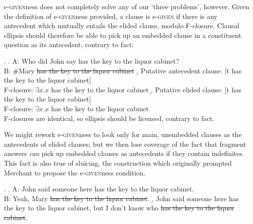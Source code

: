 \documentclass[doublespace]{umthesis}
\begin{document}

% 

e-\textsc{given}ness does not completely solve any of our `three problems', however. Given the definition of e-\textsc{given}ness provided, a clause is e-\textsc{given} if there is any antecedent which mutually entails the elided clause, modulo F-closure. Clausal ellipsis should therefore be able to pick up an embedded clause in a constituent question as its antecedent, contrary to fact:

\ex. 	\a. A: Who did John say has the key to the liquor cabinet?\\
	    B: \#Mary \sout{has the key to the liquor cabinet}
	\b. Putative antecedent clause: [t has the key to the liquor cabinet]\\
		F-closure: $\exists x. x$ has the key to the liquor cabinet
	\b. Putative elided clause: [t has the key to the liquor cabinet]\\
		F-closure: $\exists x. x$ has the key to the liquor cabinet\\
		F-closures are identical, so ellipsis should be licensed, contrary to fact.
		
We might rework e-\textsc{given}ness to look only for main, unembedded clauses as the antecedents of elided clauses; but we then lose coverage of the fact that fragment answers \emph{can} pick up embedded clauses as antecedents if they contain indefinites. This fact is also true of sluicing, the construction which originally prompted Merchant to propose the e-\textsc{given}ness condition.

\ex. 	\a. A: John said someone here has the key to the liquor cabinet.\\
		B: Yeah, Mary \sout{has the key to the liquor cabinet}.
	\b. John said someone here has the key to the liquor cabinet, but I don't know who \sout{has the key to the liquor cabinet}.
	
\end{document}
